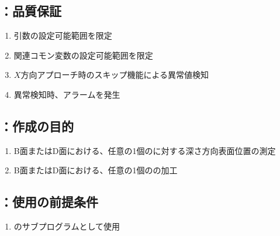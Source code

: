 \subsection{\DMLthreeAC：品質保証}
\begin{enumerate}[label*=\sarrow]
\item {}引数の設定可能範囲を限定
\item 関連コモン変数の設定可能範囲を限定
\item $X$方向アプローチ時のスキップ機能による異常値検知
\item 異常検知時、アラームを発生
\end{enumerate}



\clearpage


\subsection{\DMLthreeBD：作成の目的}
\begin{enumerate}[label*=\sarrow]
\item B面またはD面における、任意の1個の\Dimple に対する深さ方向表面位置の測定
\item B面またはD面における、任意の1個の\Dimple の加工
\end{enumerate}


\subsection{\DMLthreeBD：使用の前提条件}
\begin{enumerate}[label*=\sarrow]
\item \DLtwoBD のサブプログラムとして使用
\end{enumerate}


